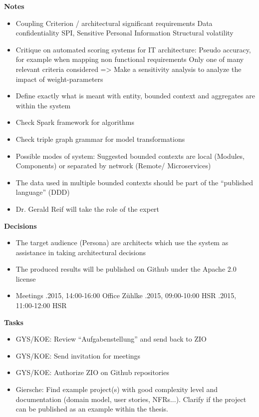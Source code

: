 \textbf{Notes}
\begin{itemize}
\item Coupling Criterion / architectural significant requirements
\subitem Data confidentiality
\subitem SPI, Sensitive Personal Information
\subitem Structural volatility
\item Critique on automated scoring systems for IT architecture:
\subitem Pseudo accuracy, for example when mapping non functional requirements
\subitem Only one of many relevant criteria considered
\subitem => Make a sensitivity analysis to analyze the impact of weight-parameters
\item Define exactly what is meant with entity, bounded context and aggregates are within the system
\item Check Spark framework for algorithms
\item Check triple graph grammar for model transformations
\item Possible modes of system: Suggested bounded contexts are local (Modules, Components) or separated by network (Remote/ Microservices)
\item The data used in multiple bounded contexts should be part of the \enquote{published language} (DDD)
\item Dr. Gerald Reif will take the role of the expert
\end{itemize}

\textbf{Decisions}
\begin{itemize}
\item The target audience (Persona) are architects which use the system as assistance in taking architectural decisions
\item The produced results will be published on Github under the Apache 2.0 license
\item Meetings 
.2015, 14:00-16:00 Office Zühlke 
.2015, 09:00-10:00 HSR
.2015, 11:00-12:00 HSR
\end{itemize}

\textbf{Tasks}
\begin{itemize}
\item GYS/KOE: Review \enquote{Aufgabenstellung} and send back to ZIO
\item GYS/KOE: Send invitation for meetings
\item GYS/KOE: Authorize ZIO on Github repositories
\item Giersche: Find example project(s) with good complexity level and documentation (domain model, user stories, NFRs...). Clarify if the project can be published as an example within the thesis.
\end{itemize}


